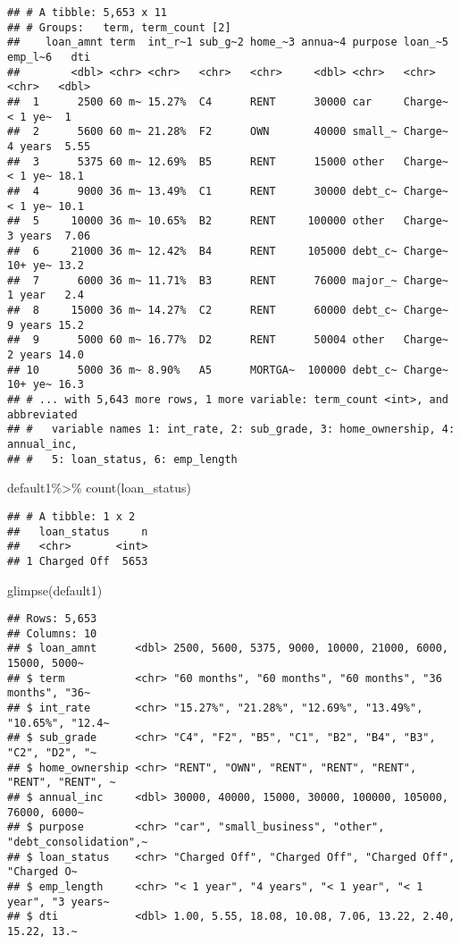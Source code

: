 \documentclass[
]{article}
\newenvironment{Shaded}{\begin{snugshade}}{\end{snugshade}}
\newcommand{\FunctionTok}[1]{\textcolor[rgb]{0.00,0.00,0.00}{#1}}
\newcommand{\NormalTok}[1]{#1}
\newcommand{\SpecialCharTok}[1]{\textcolor[rgb]{0.00,0.00,0.00}{#1}}
\begin{document}
\begin{verbatim}
## # A tibble: 5,653 x 11
## # Groups:   term, term_count [2]
##    loan_amnt term  int_r~1 sub_g~2 home_~3 annua~4 purpose loan_~5 emp_l~6   dti
##        <dbl> <chr> <chr>   <chr>   <chr>     <dbl> <chr>   <chr>   <chr>   <dbl>
##  1      2500 60 m~ 15.27%  C4      RENT      30000 car     Charge~ < 1 ye~  1   
##  2      5600 60 m~ 21.28%  F2      OWN       40000 small_~ Charge~ 4 years  5.55
##  3      5375 60 m~ 12.69%  B5      RENT      15000 other   Charge~ < 1 ye~ 18.1 
##  4      9000 36 m~ 13.49%  C1      RENT      30000 debt_c~ Charge~ < 1 ye~ 10.1 
##  5     10000 36 m~ 10.65%  B2      RENT     100000 other   Charge~ 3 years  7.06
##  6     21000 36 m~ 12.42%  B4      RENT     105000 debt_c~ Charge~ 10+ ye~ 13.2 
##  7      6000 36 m~ 11.71%  B3      RENT      76000 major_~ Charge~ 1 year   2.4 
##  8     15000 36 m~ 14.27%  C2      RENT      60000 debt_c~ Charge~ 9 years 15.2 
##  9      5000 60 m~ 16.77%  D2      RENT      50004 other   Charge~ 2 years 14.0 
## 10      5000 36 m~ 8.90%   A5      MORTGA~  100000 debt_c~ Charge~ 10+ ye~ 16.3 
## # ... with 5,643 more rows, 1 more variable: term_count <int>, and abbreviated
## #   variable names 1: int_rate, 2: sub_grade, 3: home_ownership, 4: annual_inc,
## #   5: loan_status, 6: emp_length
\end{verbatim}

\begin{Shaded}
\begin{Highlighting}[]
\NormalTok{default1}\SpecialCharTok{\%\textgreater{}\%}
  \FunctionTok{count}\NormalTok{(loan\_status)}
\end{Highlighting}
\end{Shaded}

\begin{verbatim}
## # A tibble: 1 x 2
##   loan_status     n
##   <chr>       <int>
## 1 Charged Off  5653
\end{verbatim}

\begin{Shaded}
\begin{Highlighting}[]
\FunctionTok{glimpse}\NormalTok{(default1)}
\end{Highlighting}
\end{Shaded}

\begin{verbatim}
## Rows: 5,653
## Columns: 10
## $ loan_amnt      <dbl> 2500, 5600, 5375, 9000, 10000, 21000, 6000, 15000, 5000~
## $ term           <chr> "60 months", "60 months", "60 months", "36 months", "36~
## $ int_rate       <chr> "15.27%", "21.28%", "12.69%", "13.49%", "10.65%", "12.4~
## $ sub_grade      <chr> "C4", "F2", "B5", "C1", "B2", "B4", "B3", "C2", "D2", "~
## $ home_ownership <chr> "RENT", "OWN", "RENT", "RENT", "RENT", "RENT", "RENT", ~
## $ annual_inc     <dbl> 30000, 40000, 15000, 30000, 100000, 105000, 76000, 6000~
## $ purpose        <chr> "car", "small_business", "other", "debt_consolidation",~
## $ loan_status    <chr> "Charged Off", "Charged Off", "Charged Off", "Charged O~
## $ emp_length     <chr> "< 1 year", "4 years", "< 1 year", "< 1 year", "3 years~
## $ dti            <dbl> 1.00, 5.55, 18.08, 10.08, 7.06, 13.22, 2.40, 15.22, 13.~
\end{verbatim}
\end{document}
